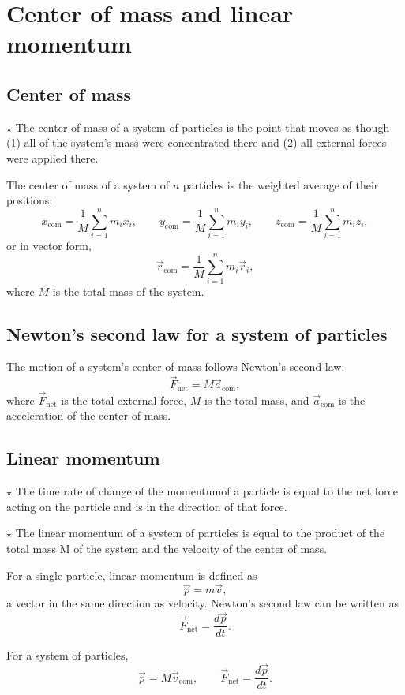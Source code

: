\section{Center of mass and linear momentum}
\subsection{Center of mass}
\noindent $\star$ The center of mass of a system of particles is the point that moves as though (1) all of the system’s mass were concentrated there and (2) all external forces were applied there.

The center of mass of a system of \( n \) particles is the weighted average of their positions:
\[
x_{\text{com}} = \frac{1}{M} \sum_{i=1}^{n} m_i x_i, \qquad
y_{\text{com}} = \frac{1}{M} \sum_{i=1}^{n} m_i y_i, \qquad
z_{\text{com}} = \frac{1}{M} \sum_{i=1}^{n} m_i z_i,
\]
or in vector form,
\[
\vec{r}_{\text{com}} = \frac{1}{M} \sum_{i=1}^{n} m_i \vec{r}_i,
\]
where \( M \) is the total mass of the system.

\subsection{Newton's second law for a system of particles}

The motion of a system’s center of mass follows Newton’s second law:
\[
\vec{F}_{\text{net}} = M \vec{a}_{\text{com}},
\]
where \( \vec{F}_{\text{net}} \) is the total external force, \( M \) is the total mass, and \( \vec{a}_{\text{com}} \) is the acceleration of the center of mass.

\subsection{Linear momentum}
\noindent $\star$ The time rate of change of the momentumof a particle is equal to the net force
acting on the particle and is in the direction of that force.

\noindent $\star$ The linear momentum of a system of particles is equal to the product of the total
mass M of the system and the velocity of the center of mass.

For a single particle, linear momentum is defined as
\[
\vec{p} = m\vec{v},
\]
a vector in the same direction as velocity.  
Newton’s second law can be written as
\[
\vec{F}_{\text{net}} = \frac{d\vec{p}}{dt}.
\]

For a system of particles,
\[
\vec{p} = M\vec{v}_{\text{com}}, \qquad \vec{F}_{\text{net}} = \frac{d\vec{p}}{dt}.
\]

